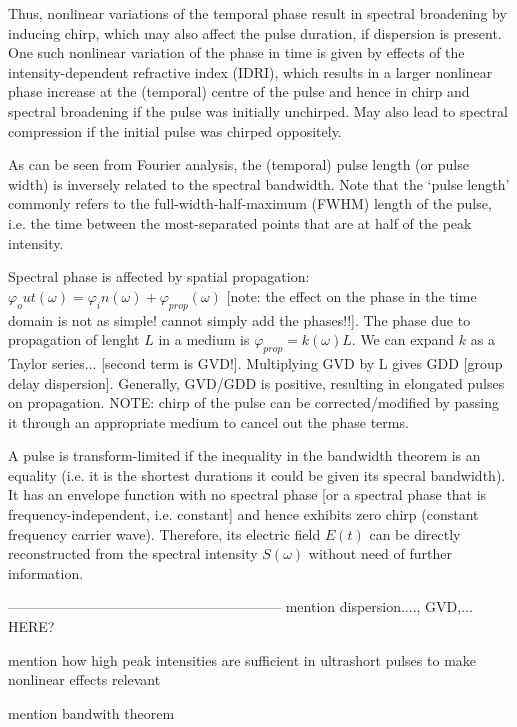 \documentclass[a4paper]{jpconf}
\begin{document}
\par 
Thus, nonlinear variations of the temporal phase result in spectral broadening by inducing chirp, which may also affect the pulse duration, if dispersion is present. One such nonlinear variation of the phase in time is given by effects of the intensity-dependent refractive index (IDRI), which results in a larger nonlinear phase increase at the (temporal) centre of the pulse and hence in chirp and spectral broadening if the pulse was initially unchirped. May also lead to spectral compression if the initial pulse was chirped oppositely.  \par 
As can be seen from Fourier analysis, the (temporal) pulse length (or pulse width) is inversely related to the spectral bandwidth. Note that the `pulse length' commonly refers to the full-width-half-maximum (FWHM) length of the pulse, i.e. the time between the most-separated points that are at half of the peak intensity. \par 
Spectral phase is affected by spatial propagation: $\varphi_out (\omega) = \varphi_in(\omega) + \varphi_{prop}(\omega)$ [note: the effect on the phase in the time domain is not as simple! cannot simply add the phases!!]. The phase due to propagation of lenght $L$ in a medium is $\varphi_{prop} =k(\omega) L$. We can expand $k$ as a Taylor series... [second term is GVD!]. Multiplying GVD by L gives GDD [group delay dispersion]. Generally, GVD/GDD is positive, resulting in elongated pulses on propagation. NOTE: chirp of the pulse can be corrected/modified by passing it through an appropriate medium to cancel out the phase terms. \par 
A pulse is transform-limited if the inequality in the bandwidth theorem is an equality (i.e. it is the shortest durations it could be given its specral bandwidth). It has an envelope function with no spectral phase [or a spectral phase that is frequency-independent, i.e. constant] and hence exhibits zero chirp (constant frequency carrier wave). Therefore, its electric field $E(t)$ can be directly reconstructed from the spectral intensity $S(\omega)$ without need of further information. 



-----------------------------------------------------------
mention dispersion...., GVD,... HERE?

mention how high peak intensities are sufficient in ultrashort pulses to make nonlinear effects relevant 

mention bandwith theorem
\end{document}

